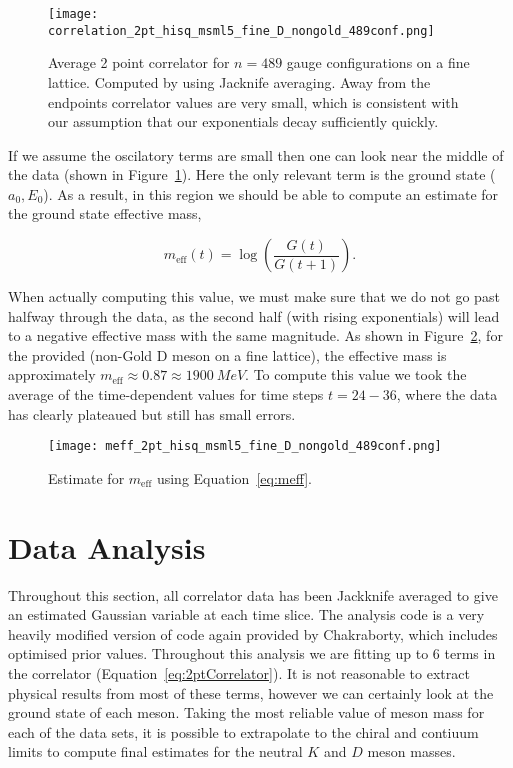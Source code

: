 \documentclass[a4paper,12pt]{article}
\begin{document}
\begin{figure}[!h]
    \centering
    \texttt{[image: correlation\_2pt\_hisq\_msml5\_fine\_D\_nongold\_489conf.png]}
    \caption{Average 2 point correlator for $n=489$ gauge configurations on a fine lattice. Computed by using Jacknife averaging. Away from the endpoints correlator values are very small, which is consistent with our assumption that our exponentials decay sufficiently quickly.\label{fig:2ptCorrelator}}
\end{figure}

If we assume the oscilatory terms are small then one can look near the middle of the data (shown in Figure~\ref{fig:2ptCorrelator}). Here the only relevant term is the ground state ($a_0, E_0$). As a result, in this region we should be able to compute an estimate for the ground state effective mass, 

\begin{equation}
    \label{eq:meff}
    m_{\text{eff}}(t) = \log(\frac{G(t)}{G(t+1)}).
\end{equation}

When actually computing this value, we must make sure that we do not go past halfway through the data, as the second half (with rising exponentials) will lead to a negative effective mass with the same magnitude. As shown in Figure~\ref{fig:2ptCorrelatorMeff}, for the provided (non-Gold D meson on a fine lattice), the effective mass is approximately $m_\text{eff} \approx 0.87 \approx \SI{1900}{MeV}$. To compute this value we took the average of the time-dependent values for time steps $t = 24 - 36$, where the data has clearly plateaued but still has small errors.

\begin{figure}[!h]
    \centering
    \texttt{[image: meff\_2pt\_hisq\_msml5\_fine\_D\_nongold\_489conf.png]}
    \caption{Estimate for $m_\text{eff}$ using Equation~\ref{eq:meff}.\label{fig:2ptCorrelatorMeff}} 
\end{figure}

\clearpage
\section{Data Analysis}
Throughout this section, all correlator data has been Jackknife averaged to give an estimated Gaussian variable at each time slice. The analysis code is a very heavily modified version of code again provided by Chakraborty, which includes optimised prior values. Throughout this analysis we are fitting up to 6 terms in the correlator (Equation~\ref{eq:2ptCorrelator}). It is not reasonable to extract physical results from most of these terms, however we can certainly look at the ground state of each meson. Taking the most reliable value of meson mass for each of the data sets, it is possible to extrapolate to the chiral and contiuum limits to compute final estimates for the neutral $K$ and $D$ meson masses.
\end{document}
